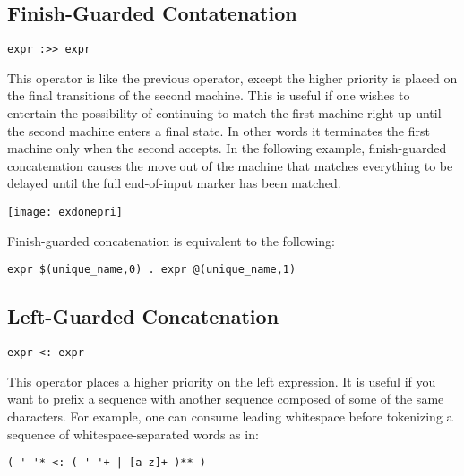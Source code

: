 \documentclass[letterpaper,11pt,oneside]{book}
\newcommand{\verbspace}{\vspace{10pt}}
\begin{document}
\subsection{Finish-Guarded Contatenation}

\verb|expr :>> expr|
\verbspace

This operator is
like the previous operator, except the higher priority is placed on the final
transitions of the second machine. This is useful if one wishes to entertain
the possibility of continuing to match the first machine right up until the
second machine enters a final state. In other words it terminates the first
machine only when the second accepts. In the following example, finish-guarded
concatenation causes the move out of the machine that matches everything to be
delayed until the full end-of-input marker has been matched.

\begin{comment}
\begin{verbatim}
# Leave the catch-all machine on the last character of FIN.
main := any* :>> 'FIN';
\end{verbatim}
\end{comment}

\begin{center}
\texttt{[image: exdonepri]}
\end{center}

Finish-guarded concatenation is equivalent to the following:

\verbspace
\begin{verbatim}
expr $(unique_name,0) . expr @(unique_name,1)
\end{verbatim}

\subsection{Left-Guarded Concatenation}

\verb|expr <: expr| 
\verbspace

This operator places
a higher priority on the left expression. It is useful if you want to prefix a
sequence with another sequence composed of some of the same characters. For
example, one can consume leading whitespace before tokenizing a sequence of
whitespace-separated words as in:

\verbspace
\begin{verbatim}
( ' '* <: ( ' '+ | [a-z]+ )** )
\end{verbatim}
\verbspace
\end{document}
